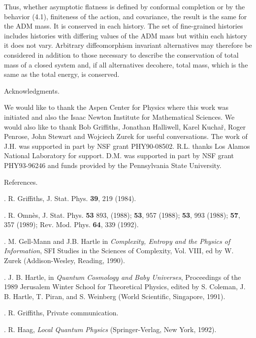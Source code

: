 Thus, whether asymptotic flatness is defined by conformal completion
or by the behavior (4.1), finiteness of the action, and covariance, the
result is the same for the ADM mass.  It is conserved in each history.
The set of fine-grained histories includes histories with differing
values of the ADM mass but within each history it does not vary.
Arbitrary diffeomorphism invariant alternatives may therefore be considered in
addition to those necessary to describe the
conservation of total mass
of a closed system and, if all alternatives
decohere, total mass, which is the same as the total energy, is conserved.

\proclaim Acknowledgments.

We would like to thank the Aspen Center for Physics where this work
was initiated and also the Isaac Newton Institute for Mathematical Sciences.
We would also like to thank Bob Griffiths, Jonathan Halliwell, Karel
Kucha\v{r}, Roger Penrose, John Stewart and Wojciech Zurek for useful
conversations.  The work of J.H. was supported in part by NSF grant
PHY90-08502.  R.L. thanks Los Alamos National Laboratory for support.
D.M. was supported in part by NSF grant PHY93-96246 and funds provided
by the Pennsylvania State University.

\proclaim References.

\item{\Gria .} R. Griffiths, J. Stat. Phys. {\bf 39}, 219 (1984).

\item{\Omn .} R. Omn\`es, J. Stat. Phys. {\bf 53} 893, (1988); {\bf 53},
957 (1988); {\bf 53}, 993 (1988); {\bf 57}, 357 (1989); Rev. Mod. Phys.
{\bf 64}, 339 (1992).

\item{\GMH .} M. Gell-Mann and J.B. Hartle in {\it
Complexity, Entropy and the Physics of Information},
SFI Studies in the Sciences of Complexity, Vol. VIII,
ed by W. Zurek  (Addison-Wesley, Reading, 1990).

\item{\HQC .} J. B. Hartle, in {\it Quantum Cosmology and Baby
Universes}, Proceedings of the 1989 Jerusalem Winter School for
Theoretical Physics, edited by S. Coleman, J. B. Hartle, T. Piran, and
S. Weinberg (World Scientific, Singapore, 1991).

\item{\Grib .} R. Griffiths, Private communication.

\item{\RH .} R. Haag, {\it Local Quantum Physics}  (Springer-Verlag, New
York, 1992).


